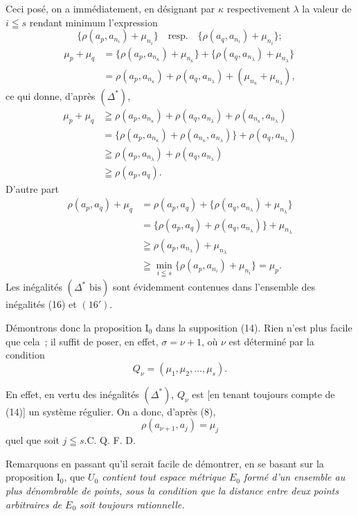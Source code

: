 \documentclass[a4paper,12pt]{amsart}
\newcommand{\srcpage}[1]{} %
\begin{document}
Ceci posé, on a immédiatement, en désignant par $\kappa$ respectivement $\lambda$ la valeur de $i\leqq s$ rendant minimum l'expression
\[
\{\rho(a_p,a_{n_i})+\mu_{n_i}\}\quad\text{resp.}\quad\{\rho(a_q,a_{n_i})+\mu_{n_i}\};
\]
\[
\begin{aligned}
\mu_p+\mu_q&=\{\rho(a_p,a_{n_\kappa})+\mu_{n_\kappa}\}+\{\rho(a_q,a_{n_\lambda})+\mu_{n_\lambda}\}\\
&=\rho(a_p,a_{n_\kappa})+\rho(a_q,a_{n_\lambda})+(\mu_{n_\kappa}+\mu_{n_\lambda}),
\end{aligned}
\]
ce qui donne, d'après $(\Delta^*)$,
\begin{equation}\tag{16}
\begin{aligned}
\mu_p+\mu_q&\geqq\rho(a_p,a_{n_\kappa})+\rho(a_q,a_{n_\lambda})+\rho(a_{n_\kappa},a_{n_\lambda})\\
&=\{\rho(a_p,a_{n_\kappa})+\rho(a_{n_\kappa},a_{n_\lambda})\}+\rho(a_q,a_{n_\lambda})\\
&\geqq\rho(a_p,a_{n_\lambda})+\rho(a_q,a_{n_\lambda})\\
&\geqq\rho(a_p,a_q).
\end{aligned}
\end{equation}
D'autre part
\begin{equation}\tag{$16'$}
\begin{aligned}
\rho(a_p,a_q)+\mu_q&=\rho(a_p,a_q)+\{\rho(a_q,a_{n_\lambda})+\mu_{n_\lambda}\}\\
&=\{\rho(a_p,a_q)+\rho(a_q,a_{n_\lambda})\}+\mu_{n_\lambda}\\
&\geqq\rho(a_p,a_{n_\lambda})+\mu_{n_\lambda}\\
&\geqq\min_{i\leqq s}\{\rho(a_p,a_{n_i})+\mu_{n_i}\}=\mu_p.
\end{aligned}
\end{equation}
Les inégalités $(\Delta^*\text{ bis})$ sont évidemment contenues dans l'ensemble des inégalités (16) et $(16')$.

Démontrons donc la proposition I$_0$ dans la supposition (14). Rien n'est plus facile que cela~; il suffit de poser, en effet, $\sigma=\nu+1$, où $\nu$ est déterminé par la condition
\[
Q_\nu=(\mu_1,\mu_2,\dots,\mu_s).
\]
\srcpage{58}
En effet, en vertu des inégalités $(\Delta^*)$, $Q_\nu$ est [en tenant toujours compte de (14)] un système régulier. On a donc, d'après (8),
\[
\rho(a_{\nu+1},a_j)=\mu_j
\]
quel que soit $j\leqq s$.\hfill C. Q. F. D.

Remarquons en passant qu'il serait facile de démontrer, en se basant sur la proposition I$_0$, que \textit{$U_0$ contient tout espace métrique $E_0$ formé d'un ensemble au plus dénombrable de points, sous la condition que la distance entre deux points arbitraires de $E_0$ soit toujours rationnelle.}
\end{document}

